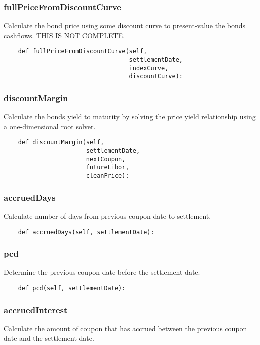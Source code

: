 \documentclass[twoside,11pt]{book}
\begin{document}
\subsubsection*{{\bf fullPriceFromDiscountCurve}}
Calculate the bond price using some discount curve to present-value the bonds cashflows. THIS IS NOT COMPLETE.  

\begin{lstlisting}
    def fullPriceFromDiscountCurve(self,
                                   settlementDate,
                                   indexCurve,
                                   discountCurve):
\end{lstlisting}

\subsubsection*{{\bf discountMargin}}
Calculate the bonds yield to maturity by solving the price yield relationship using a one-dimensional root solver.  

\begin{lstlisting}
    def discountMargin(self,
                       settlementDate,
                       nextCoupon,
                       futureLibor,
                       cleanPrice):
\end{lstlisting}

\subsubsection*{{\bf accruedDays}}
Calculate number of days from previous coupon date to settlement. 

\begin{lstlisting}
    def accruedDays(self, settlementDate):
\end{lstlisting}

\subsubsection*{{\bf pcd}}
Determine the previous coupon date before the settlement date.  

\begin{lstlisting}
    def pcd(self, settlementDate):
\end{lstlisting}

\subsubsection*{{\bf accruedInterest}}
Calculate the amount of coupon that has accrued between the previous coupon date and the settlement date.  
\end{document}
